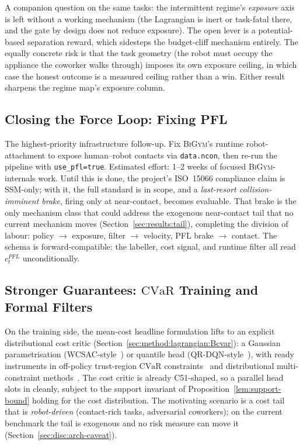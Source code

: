 \documentclass[11pt,a4paper]{report}
\newcommand{\ssm}{SSM}
\newcommand{\pfl}{PFL}
\newcommand{\iso}{ISO~15066}
\newcommand{\cvar}{\ensuremath{\mathrm{CVaR}}}
\newcommand{\bigym}{\textsc{BiGym}}
\begin{document}
\label{sec:fw:proactive}%
A companion question on the same tasks: the intermittent regime's
\emph{exposure} axis is left without a working mechanism (the
Lagrangian is inert or task-fatal there, and the gate by design does
not reduce exposure). The open lever is a potential-based separation
reward, which sidesteps the budget-cliff mechanism entirely. The
equally concrete risk is that the task geometry (the robot must
occupy the appliance the coworker walks through) imposes its own
exposure ceiling, in which case the honest outcome is a measured
ceiling rather than a win. Either result sharpens the regime map's
exposure column.

\subsection{Closing the Force Loop: Fixing \pfl{}}
\label{sec:fw:pfl}

The highest-priority infrastructure follow-up. Fix \bigym{}'s runtime
robot-attachment to expose human--robot contacts via
\texttt{data.ncon}, then re-run the pipeline with
\texttt{use\_pfl=true}. Estimated effort: 1--2 weeks of focused
\bigym{}-internals work. Until this is done, the project's \iso{}
compliance claim is \ssm{}-only; with it, the full standard is in
scope, and a \emph{last-resort collision-imminent brake}, firing only
at near-contact, becomes evaluable. That brake is the only mechanism
class that could address the exogenous near-contact tail that no
current mechanism moves (Section~\ref{sec:results:tail}),
completing the division of labour:
policy $\to$ exposure, filter $\to$ velocity, \pfl{} brake $\to$
contact. The schema is forward-compatible: the labeller, cost signal,
and runtime filter all read $c^{\pfl}_t$ unconditionally.

\subsection{Stronger Guarantees: \cvar{} Training and Formal Filters}
\label{sec:fw:cvar}
\label{sec:fw:formal}
\label{sec:fw:fallback}
\label{sec:fw:filter-during-training}

On the training side, the mean-cost headline formulation lifts to an
explicit distributional cost critic
(Section~\ref{sec:method:lagrangian:Bcvar}): a Gaussian
parametrisation (WCSAC-style~\cite{yang2021wcsac}) or quantile head
(QR-DQN-style~\cite{dabney2018qrdqn}), with ready instruments in
off-policy trust-region \cvar{} constraints~\cite{kim2022offtrc} and
distributional multi-constraint methods~\cite{kim2023sdac}. The cost
critic is already C51-shaped, so a parallel head slots in cleanly,
subject to the support invariant of
Proposition~\ref{lem:support-bound} holding for the cost
distribution. The motivating scenario is a cost tail that is
\emph{robot-driven} (contact-rich tasks, adversarial coworkers); on
the current benchmark the tail is exogenous and no risk measure can
move it (Section~\ref{sec:disc:arch-caveat}).
\end{document}

